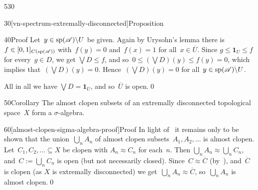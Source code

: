\begin{parsec}{530}
\begin{point}{30}[vn-spectrum-extremally-disconnected]{Proposition}
\begin{point}{40}{Proof}
Let~$y\in \mathrm{sp}(\mathscr{A})\backslash U$ be given.
Again by Urysohn's lemma
there is $f\in [0,1]_{C(\mathrm{sp}(\mathscr{A}))}$
with~$f(y)=0$ and~$f(x)=1$ for all~$x\in \overline{U}$.
Since $g\leq \mathbf{1}_U \leq f$
for every~$g\in D$,
we get $\bigvee D\leq f$,
and so~$0\leq (\bigvee D)(y)\leq f(y) =0$,
which implies that~$(\bigvee D)(y)=0$.
Hence~$(\bigvee D)(y)=0$ for all~$y\in \mathrm{sp}(\mathscr{A})\backslash U$.

All in all we have $\bigvee D = \mathbf{1}_{\overline{U}}$,
and so~$\overline{U}$ is open.\qed
\end{point}
\end{point}
\begin{point}{50}{Corollary}%
The almost clopen subsets
of an extremally disconnected topological
space~$X$ form a $\sigma$-algebra.
\begin{point}{60}[almost-clopen-sigma-algebra-proof]{Proof}%
In light of~
it remains only to be shown that
the union~$\bigcup_n A_n$
of almost clopen subsets~$A_1,A_2,\dotsc$
is almost clopen.
Let~$C_1,C_2,\dotsc\subseteq X$
be clopen with $A_n\approx C_n$ for each~$n$.
Then $\bigcup_n A_n \approx \bigcup_n C_n$,
and~$C:=\bigcup_n C_n$ is open
(but not necessarily closed).
Since~$C\approx \overline{C}$
(by~),
and~$\overline{C}$ is clopen (as $X$ is extremally disconnected)
we get~$\bigcup_n A_n \approx \overline{C}$,
so~$\bigcup_n A_n$ is almost clopen.\qed
\end{point}
\end{point}
\end{parsec}

